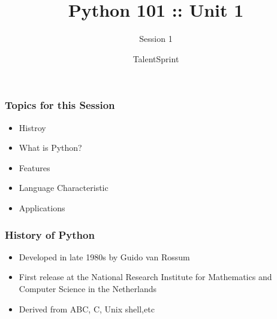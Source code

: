 \documentclass[14pt]{beamer}
\title{Python 101 :: Unit 1}
\subtitle{Session 1}
\date{}
\author[TS]{TalentSprint}
\begin{document}
    \begin{frame}
        \titlepage
    \end{frame}

    \begin{frame}
        \frametitle{Topics for this Session}
        \begin{itemize}
            \item Histroy
            \item What is Python?
            \item Features
            \item Language Characteristic
            \item Applications
        \end{itemize}
    \end{frame}
    
    \begin{frame}
        \frametitle{History of Python}
        \begin{itemize}
            \item Developed in late 1980s by Guido van Rossum
            \item First release at the National Research Institute for Mathematics and Computer Science in the Netherlands
            \item Derived from ABC, C, Unix shell,etc
        \end{itemize}
    \end{frame}
    
\end{document}
